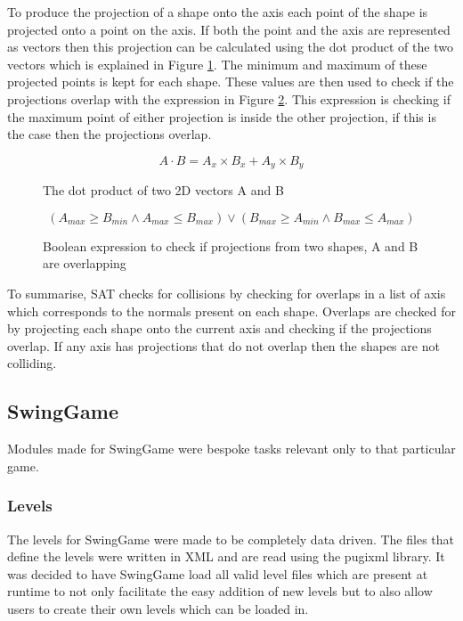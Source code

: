 \documentclass[]{report}
\begin{document}
			To produce the projection of a shape onto the axis each point of the shape is projected onto a point on the axis. If both the point and the axis are represented as vectors then this projection can be calculated using the dot product of the two vectors \cite{sattutorial} which is explained in Figure \ref{dotproduct}. The minimum and maximum of these projected points is kept for each shape. These values are then used to check if the projections overlap with the expression in Figure \ref{projectionoverlapexpression}. This expression is checking if the maximum point of either projection is inside the other projection, if this is the case then the projections overlap.
			
			\begin{figure}[H]
				\centering
				\begin{displaymath}
					A \cdot B = A_x \times B_x + A_y \times B_y
				\end{displaymath}
				\caption{The dot product of two 2D vectors A and B}
				\label{dotproduct}
			\end{figure}
			
			\begin{figure}[H]
				\centering
				\begin{displaymath}
					(A_{max} \geq B_{min} \land A_{max} \leq B_{max}) \lor (B_{max} \geq A_{min} \land B_{max} \leq A_{max})
				\end{displaymath}
				\caption{Boolean expression to check if projections from two shapes, A and B are overlapping}
				\label{projectionoverlapexpression}
			\end{figure}
			
			To summarise, SAT checks for collisions by checking for overlaps in a list of axis which corresponds to the normals present on each shape. Overlaps are checked for by projecting each shape onto the current axis and checking if the projections overlap. If any axis has projections that do not overlap then the shapes are not colliding.
			
		\subsection{SwingGame}
		Modules made for SwingGame were bespoke tasks relevant only to that particular game.
			\subsubsection{Levels}
			The levels for SwingGame were made to be completely data driven. The files that define the levels were written in XML and are read using the pugixml library. It was decided to have SwingGame load all valid level files which are present at runtime to not only facilitate the easy addition of new levels but to also allow users to create their own levels which can be loaded in.
			
\end{document}
